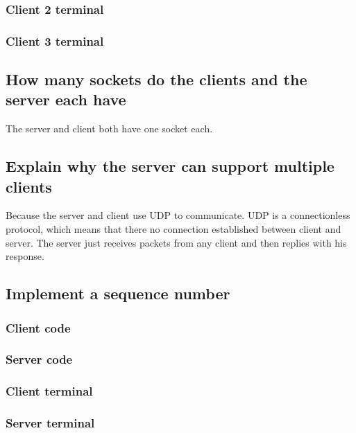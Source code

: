 \documentclass[a4paper,12pt]{article}
\begin{document}
\subsubsection{Client 2 terminal}

\subsubsection{Client 3 terminal}

\subsection{How many sockets do the clients and the server each have}
The server and client both have one socket each.

\subsection{Explain why the server can support multiple clients}
Because the server and client use UDP to communicate.
UDP is a connectionless protocol, which means that there no connection established between client and server.
The server just receives packets from any client and then replies with his response.

\subsection{Implement a sequence number}

\subsubsection{Client code}

\subsubsection{Server code}

\subsubsection{Client terminal}

\subsubsection{Server terminal}
\end{document}
